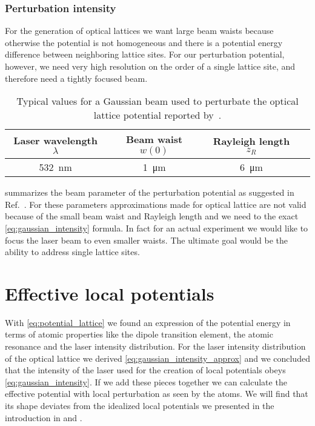 \subsubsection{Perturbation intensity}

For the generation of optical lattices we want large beam waists because
otherwise the potential is not homogeneous and there is a potential energy
difference between neighboring lattice sites. For our perturbation potential,
however, we need very high resolution on the order of a single lattice site,
and therefore need a tightly focused beam.
\begin{table}[ht]
  \centering
  \begin{tabular}{cccc}
    \toprule
    Laser wavelength $\lambda$ &
    Beam waist $w(0)$ &
    Rayleigh length $z_R$ \\
    \midrule
    \SI{532}{\nano\meter} &
    \SI{1}{\micro\meter} &
    \SI{6}{\micro\meter} \\
    \bottomrule
  \end{tabular}
  \captionsetup{width=.8\textwidth}
  \caption{Typical values for a Gaussian beam used to perturbate the optical
    lattice potential reported by~\cite{Hertlein2017}.
  }\label{tab:gaussian_beam_perturbation}
\end{table}
 summarizes the beam parameter of the
perturbation potential as suggested in Ref.~\cite{Hertlein2017}. For these
parameters approximations made for optical lattice are not valid because of
the small beam waist and Rayleigh length and we need to the exact
\cref{eq:gaussian_intensity} formula. In fact for an actual experiment we
would like to focus the laser beam to even smaller waists. The ultimate goal
would be the ability to address single lattice sites.

\section{Effective local potentials}

With \cref{eq:potential_lattice} we found an expression of the potential
energy in terms of atomic properties like the dipole transition element, the
atomic resonance and the laser intensity distribution. For the laser intensity
distribution of the optical lattice we derived
\cref{eq:gaussian_intensity_approx} and we concluded that the intensity of the
laser used for the creation of local potentials obeys
\cref{eq:gaussian_intensity}. If we add these pieces together we can calculate
the effective potential with local perturbation as seen by the atoms. We will
find that its shape deviates from the idealized local potentials we presented
in the introduction in  and 
.

